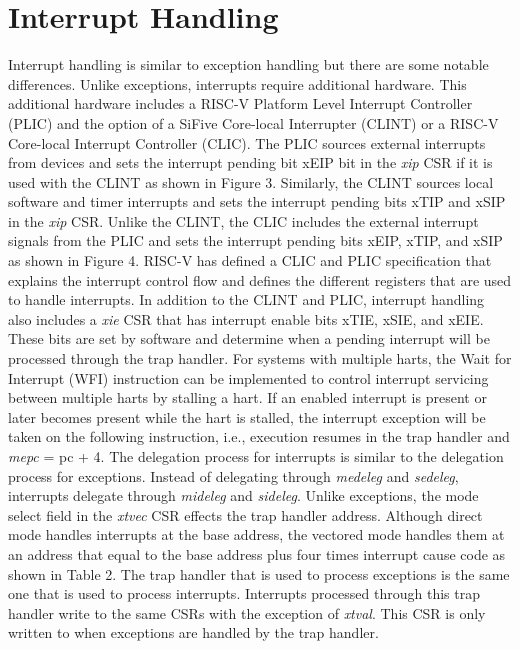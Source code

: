 \documentclass[12pt]{article}
\begin{document}
\section{Interrupt Handling}
Interrupt handling is similar to exception handling but there are some notable differences. Unlike exceptions, interrupts require additional hardware. This additional hardware includes a RISC-V Platform Level Interrupt Controller (PLIC)\cite{PLIC} and the option of a SiFive Core-local Interrupter (CLINT)\cite{CLINT} or a RISC-V Core-local Interrupt Controller (CLIC)\cite{CLIC}. The PLIC sources external interrupts from devices and sets the interrupt pending bit xEIP bit in the \emph{xip} CSR if it is used with the CLINT as shown in Figure 3. Similarly, the CLINT sources local software and timer interrupts and sets the interrupt pending bits xTIP and xSIP in the \emph{xip} CSR. Unlike the CLINT, the CLIC includes the external interrupt signals from the PLIC and sets the interrupt pending bits xEIP, xTIP, and xSIP as shown in Figure 4. RISC-V has defined a CLIC and PLIC specification that explains the interrupt control flow and defines the different registers that are used to handle interrupts. In addition to the CLINT and PLIC, interrupt handling also includes a \emph{xie} CSR that has interrupt enable bits xTIE, xSIE, and xEIE. These bits are set by software and determine when a pending interrupt will be processed through the trap handler. For systems with multiple harts, the Wait for Interrupt (WFI) instruction can be implemented to control interrupt servicing between multiple harts by stalling a hart. If an enabled interrupt is present or later becomes present while the hart is stalled, the interrupt exception will be taken on the following instruction, i.e., execution resumes in the trap handler and \emph{mepc} = pc + 4. The delegation process for interrupts is similar to the delegation process for exceptions. Instead of delegating through \emph{medeleg} and \emph{sedeleg}, interrupts delegate through \emph{mideleg} and \emph{sideleg}. Unlike exceptions, the mode select field in the \emph{xtvec} CSR effects the trap handler address. Although direct mode handles interrupts at the base address, the vectored mode handles them at an address that equal to the base address plus four times interrupt cause code as shown in Table 2. The trap handler that is used to process exceptions is the same one that is used to process interrupts. Interrupts processed through this trap handler write to the same CSRs with the exception of \emph{xtval}. This CSR is only written to when exceptions are handled by the trap handler.
\end{document}
